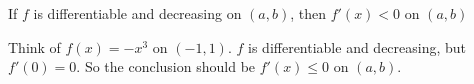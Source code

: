 \documentclass{ximera}
\author{Steven Gubkin\and Nela Lakos}
\begin{document}
\begin{exercise}


	If $f$ is differentiable and decreasing on $(a,b)$, then $f'(x)<0$ on $(a,b)$
	\begin{hint}
Think of $f(x)=-x^3$ on $(-1,1)$. $f$ is differentiable and decreasing, but $f'(0)=0$. So the conclusion should be $f'(x)\leq 0$ on $(a,b)$. 
\end{hint}	
	\begin{multipleChoice}	
	\end{multipleChoice}

\end{exercise}
\end{document}
